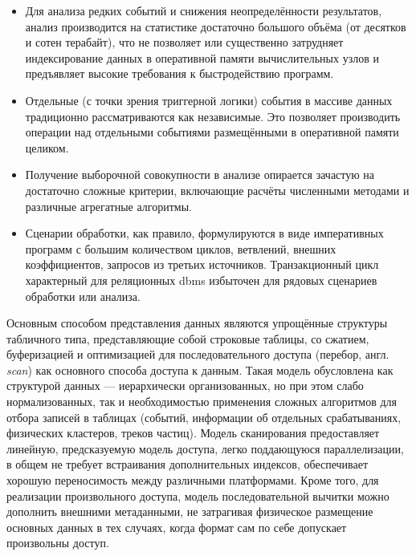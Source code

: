 \begin{itemize}
    \item Для анализа редких событий и снижения неопределённости результатов,
    анализ производится на статистике достаточно большого объёма (от
    десятков и сотен терабайт), что не позволяет или существенно затрудняет
    индексирование данных в оперативной памяти вычислительных узлов и
    предъявляет высокие требования к быстродействию программ.
    \item Отдельные (с точки зрения триггерной логики) события в массиве
    данных традиционно рассматриваются как независимые. Это
    позволяет производить операции над отдельными событиями размещёнными в
    оперативной памяти целиком.
    \item Получение выборочной совокупности в анализе опирается зачастую на
    достаточно сложные критерии, включающие расчёты численными методами и
    различные агрегатные алгоритмы.
    \item Сценарии обработки, как правило, формулируются в виде императивных
    программ с большим количеством циклов, ветвлений, внешних коэффициентов,
    запросов из третьих источников. Транзакционный цикл характерный для
    реляционных \acrshort{dbms} избыточен для рядовых сценариев
    обработки или анализа.
\end{itemize}

Основным способом представления данных являются упрощённые структуры
табличного типа, представляющие
собой строковые таблицы, со сжатием, буферизацией и оптимизацией для
последовательного доступа (перебор, англ. \emph{scan}) как основного
способа доступа к данным. Такая модель обусловлена
как структурой данных --- иерархически организованных, но при этом слабо
нормализованных, так и необходимостью применения сложных алгоритмов для
отбора записей в таблицах (событий, информации об отдельных срабатываниях,
физических кластеров, треков частиц). Модель сканирования предоставляет
линейную, предсказуемую модель доступа, легко поддающуюся параллелизации,
в общем не требует встраивания дополнительных индексов,
обеспечивает хорошую переносимость между различными платформами. Кроме того,
для реализации произвольного доступа, модель последовательной вычитки можно
дополнить внешними метаданными, не затрагивая физическое размещение
основных данных в тех случаях, когда формат сам по себе допускает произвольны
доступ.


